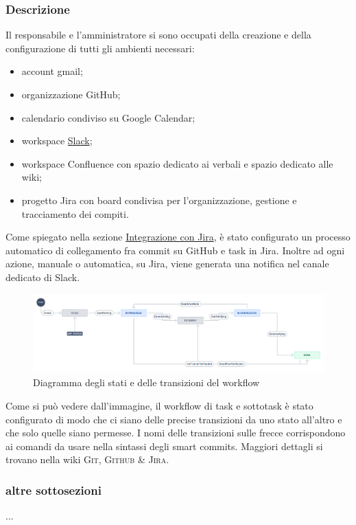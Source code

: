     \subsubsection{Descrizione}
    Il responsabile e l'amministratore si sono occupati della creazione e della configurazione di tutti gli ambienti necessari:
    \begin{itemize}
        \item account gmail;
        \item organizzazione GitHub;
        \item calendario condiviso su Google Calendar;
        \item workspace \href{https://slack.com/intl/en-it/about}{Slack};
        \item workspace Confluence con spazio dedicato ai verbali e spazio dedicato alle wiki;
        \item progetto Jira con board condivisa per l'organizzazione, gestione e tracciamento dei compiti.
    \end{itemize}
        Come spiegato nella sezione \hyperref[jiraintegration]{Integrazione con Jira}, è stato configurato un processo automatico di collegamento fra commit su GitHub e task in Jira. Inoltre ad ogni azione, manuale o automatica, su Jira, viene generata una notifica nel canale dedicato di Slack.
        \begin{figure}[H]
            \centering
            \includegraphics[scale=0.32]{res/images/jira_workflow.png}
            \caption{Diagramma degli stati e delle transizioni del workflow}
        \end{figure}
            Come si può vedere dall'immagine, il workflow di task e sottotask è stato configurato di modo che ci siano delle precise transizioni da uno stato all'altro e che solo quelle siano permesse. I nomi delle transizioni sulle frecce corrispondono ai comandi da usare nella sintassi degli smart commits. Maggiori dettagli si trovano nella wiki \textsc{Git, Github \& Jira}.

    \subsubsection{altre sottosezioni}
    ...
